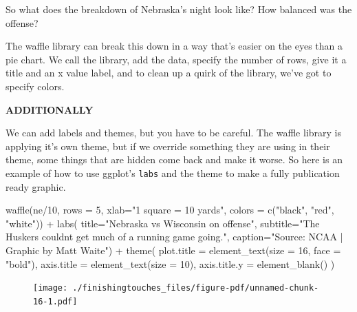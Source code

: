 \documentclass[
  letterpaper,
  DIV=11,
  numbers=noendperiod]{scrreprt}
\newenvironment{Shaded}{\begin{snugshade}}{\end{snugshade}}
\newcommand{\AttributeTok}[1]{\textcolor[rgb]{0.40,0.45,0.13}{#1}}
\newcommand{\DecValTok}[1]{\textcolor[rgb]{0.68,0.00,0.00}{#1}}
\newcommand{\FunctionTok}[1]{\textcolor[rgb]{0.28,0.35,0.67}{#1}}
\newcommand{\NormalTok}[1]{\textcolor[rgb]{0.00,0.23,0.31}{#1}}
\newcommand{\SpecialCharTok}[1]{\textcolor[rgb]{0.37,0.37,0.37}{#1}}
\newcommand{\StringTok}[1]{\textcolor[rgb]{0.13,0.47,0.30}{#1}}
\begin{document}
So what does the breakdown of Nebraska's night look like? How balanced
was the offense?

The waffle library can break this down in a way that's easier on the
eyes than a pie chart. We call the library, add the data, specify the
number of rows, give it a title and an x value label, and to clean up a
quirk of the library, we've got to specify colors.

\textbf{ADDITIONALLY}

We can add labels and themes, but you have to be careful. The waffle
library is applying it's own theme, but if we override something they
are using in their theme, some things that are hidden come back and make
it worse. So here is an example of how to use ggplot's \texttt{labs} and
the theme to make a fully publication ready graphic.

\begin{Shaded}
\begin{Highlighting}[]
\FunctionTok{waffle}\NormalTok{(ne}\SpecialCharTok{/}\DecValTok{10}\NormalTok{, }\AttributeTok{rows =} \DecValTok{5}\NormalTok{, }\AttributeTok{xlab=}\StringTok{"1 square = 10 yards"}\NormalTok{, }\AttributeTok{colors =} \FunctionTok{c}\NormalTok{(}\StringTok{"black"}\NormalTok{, }\StringTok{"red"}\NormalTok{, }\StringTok{"white"}\NormalTok{)) }\SpecialCharTok{+} 
  \FunctionTok{labs}\NormalTok{(}
    \AttributeTok{title=}\StringTok{"Nebraska vs Wisconsin on offense"}\NormalTok{, }
    \AttributeTok{subtitle=}\StringTok{"The Huskers couldn\textquotesingle{}t get much of a running game going."}\NormalTok{,}
    \AttributeTok{caption=}\StringTok{"Source: NCAA | Graphic by Matt Waite"}\NormalTok{) }\SpecialCharTok{+} 
  \FunctionTok{theme}\NormalTok{(}
    \AttributeTok{plot.title =} \FunctionTok{element\_text}\NormalTok{(}\AttributeTok{size =} \DecValTok{16}\NormalTok{, }\AttributeTok{face =} \StringTok{"bold"}\NormalTok{),}
    \AttributeTok{axis.title =} \FunctionTok{element\_text}\NormalTok{(}\AttributeTok{size =} \DecValTok{10}\NormalTok{),}
    \AttributeTok{axis.title.y =} \FunctionTok{element\_blank}\NormalTok{()}
\NormalTok{  )}
\end{Highlighting}
\end{Shaded}

\begin{figure}[H]

{\centering \texttt{[image: ./finishingtouches\_files/figure-pdf/unnamed-chunk-16-1.pdf]}

}

\end{figure}
\end{document}
